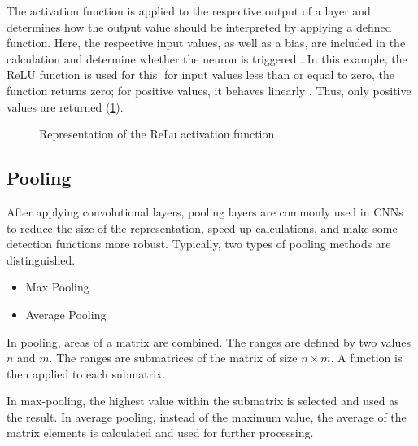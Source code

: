 {	The activation function is applied to the respective output of a layer and determines how the output value should be interpreted by applying a defined function. Here, the respective input values, as well as a bias, are included in the calculation and determine whether the neuron is triggered \cite{Nwankpa:2018}. In this example, the ReLU function is used for this: for input values less than or equal to zero, the function returns zero; for positive values, it behaves linearly \cite{Agarap:2018}. Thus, only positive values are returned (\ref{fig:relu}).
	
	\begin{figure}
		\centering
		\caption{Representation of the ReLu activation function}
		\label{fig:relu}
	\end{figure}
	
	\subsection*{Pooling}
	
	
	After applying convolutional layers, pooling layers are commonly used in CNNs to reduce the size of the representation, speed up calculations, and make some detection functions more robust. Typically, two types of pooling methods are distinguished.
	
	\begin{itemize}
		\item Max Pooling
		\item Average Pooling
	\end{itemize}
	
	In pooling, areas of a matrix are combined. The ranges are defined by two values $n$ and $m$. The ranges are submatrices of the matrix of size $n \times m$. A function is then applied to each submatrix.
	
	In max-pooling, the highest value within the submatrix is selected and used as the result. In average pooling, instead of the maximum value, the average of the matrix elements is calculated and used for further processing.
	
}
